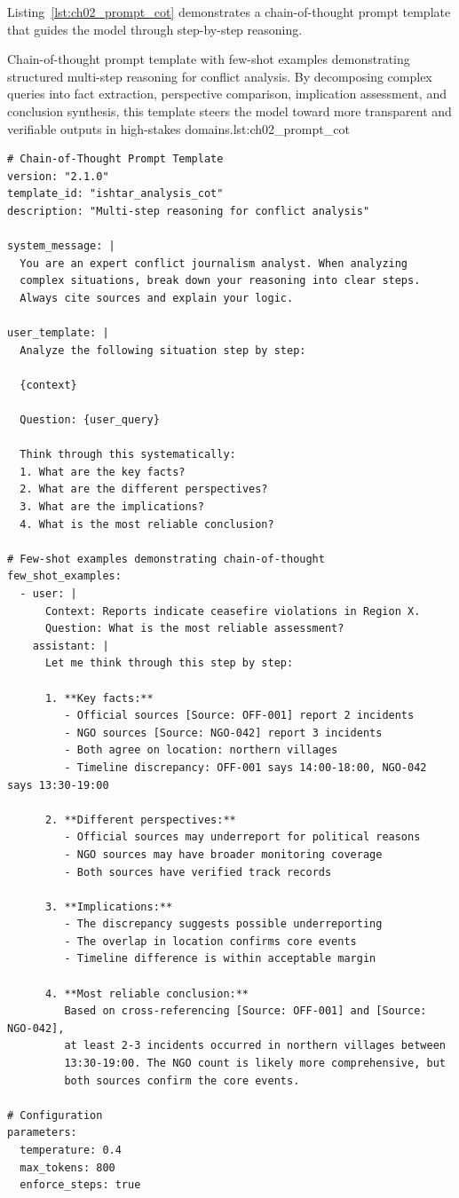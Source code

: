 Listing~\ref{lst:ch02_prompt_cot} demonstrates a chain-of-thought prompt template that guides the model through step-by-step reasoning.

\begin{codebox}{Chain-of-thought prompt template with few-shot examples demonstrating structured multi-step reasoning for conflict analysis. By decomposing complex queries into fact extraction, perspective comparison, implication assessment, and conclusion synthesis, this template steers the model toward more transparent and verifiable outputs in high-stakes domains.}{lst:ch02_prompt_cot}
\begin{verbatim}
# Chain-of-Thought Prompt Template
version: "2.1.0"
template_id: "ishtar_analysis_cot"
description: "Multi-step reasoning for conflict analysis"

system_message: |
  You are an expert conflict journalism analyst. When analyzing
  complex situations, break down your reasoning into clear steps.
  Always cite sources and explain your logic.

user_template: |
  Analyze the following situation step by step:

  {context}

  Question: {user_query}

  Think through this systematically:
  1. What are the key facts?
  2. What are the different perspectives?
  3. What are the implications?
  4. What is the most reliable conclusion?

# Few-shot examples demonstrating chain-of-thought
few_shot_examples:
  - user: |
      Context: Reports indicate ceasefire violations in Region X.
      Question: What is the most reliable assessment?
    assistant: |
      Let me think through this step by step:

      1. **Key facts:**
         - Official sources [Source: OFF-001] report 2 incidents
         - NGO sources [Source: NGO-042] report 3 incidents
         - Both agree on location: northern villages
         - Timeline discrepancy: OFF-001 says 14:00-18:00, NGO-042 says 13:30-19:00

      2. **Different perspectives:**
         - Official sources may underreport for political reasons
         - NGO sources may have broader monitoring coverage
         - Both sources have verified track records

      3. **Implications:**
         - The discrepancy suggests possible underreporting
         - The overlap in location confirms core events
         - Timeline difference is within acceptable margin

      4. **Most reliable conclusion:**
         Based on cross-referencing [Source: OFF-001] and [Source: NGO-042],
         at least 2-3 incidents occurred in northern villages between
         13:30-19:00. The NGO count is likely more comprehensive, but
         both sources confirm the core events.

# Configuration
parameters:
  temperature: 0.4
  max_tokens: 800
  enforce_steps: true
\end{verbatim}
\end{codebox}

